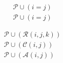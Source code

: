 \documentclass[conference]{IEEEtran}
\newcommand{\lfmt}{\ensuremath{\lambda\Pi\text{-modulo theory}}}
\newcommand{\defn}{\ensuremath{:=}}
\newcommand{\tabs}[3]{\ensuremath{\lambda{#1}\,{:}\,{#2}.\,{#3}}}
\newcommand{\tapp}[2]{\ensuremath{{#1}~{#2}}}
\newcommand{\tpi}[3]{\ensuremath{\Pi{#1}\,{:}\,{#2}.\,{#3}}}
\begin{document}
\begin{align*}
  & \mathcal{P} \cup (i = j)\\
  & \mathcal{P} \cup (i = j)
\end{align*}

\begin{align*}
  & \mathcal{P} \cup (\mathcal{R}(i,j,k))\\
  & \mathcal{P} \cup (\mathcal{C}(i,j))\\
  & \mathcal{P} \cup (\mathcal{A}(i,j))
\end{align*}






\end{document}
